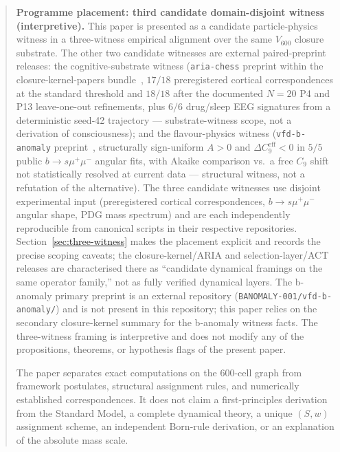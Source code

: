\documentclass[12pt]{article}
\begin{document}
\begin{abstract}
\medskip
\noindent\textbf{Programme placement: third candidate domain-disjoint witness (interpretive).}
This paper is presented as a candidate particle-physics witness in a three-witness empirical alignment over the same $V_{600}$ closure substrate. The other two candidate witnesses are external paired-preprint releases: the cognitive-substrate witness (\texttt{aria-chess} preprint within the closure-kernel-papers bundle~\citep{SmartARIAChess2026, SmartARIAClosureKernel2026}, $17/18$ preregistered cortical correspondences at the standard threshold and $18/18$ after the documented $N=20$ P4 and P13 leave-one-out refinements, plus $6/6$ drug/sleep EEG signatures from a deterministic seed-42 trajectory --- substrate-witness scope, not a derivation of consciousness); and the flavour-physics witness (\texttt{vfd-b-anomaly} preprint~\citep{SmartBAnomaly}, structurally sign-uniform $A > 0$ and $\Delta C_9^{\mathrm{eff}} < 0$ in $5/5$ public $b \to s\mu^+\mu^-$ angular fits, with Akaike comparison vs.\ a free $C_9$ shift not statistically resolved at current data --- structural witness, not a refutation of the alternative). The three candidate witnesses use disjoint experimental input (preregistered cortical correspondences, $b\to s\mu^+\mu^-$ angular shape, PDG mass spectrum) and are each independently reproducible from canonical scripts in their respective repositories. Section~\ref{sec:three-witness} makes the placement explicit and records the precise scoping caveats; the closure-kernel/ARIA and selection-layer/ACT releases are characterised there as ``candidate dynamical framings on the same operator family,'' not as fully verified dynamical layers. The b-anomaly primary preprint is an external repository (\texttt{BANOMALY-001/vfd-b-anomaly/}) and is not present in this repository; this paper relies on the secondary closure-kernel summary for the b-anomaly witness facts. The three-witness framing is interpretive and does not modify any of the propositions, theorems, or hypothesis flags of the present paper.

\medskip
The paper separates exact computations on the 600-cell graph from framework postulates, structural assignment rules, and numerically established correspondences. It does not claim a first-principles derivation from the Standard Model, a complete dynamical theory, a unique $(S,w)$ assignment scheme, an independent Born-rule derivation, or an explanation of the absolute mass scale.
\end{abstract}

\end{document}
